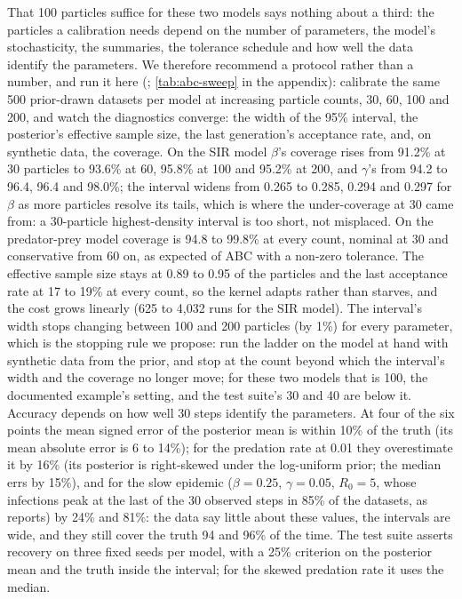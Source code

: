 That 100 particles suffice for these two models says nothing about a third: the particles a
calibration needs depend on the number of parameters, the model's stochasticity, the
summaries, the tolerance schedule and how well the data identify the parameters. We
therefore recommend a protocol rather than a number, and run it here
(; \cref{tab:abc-sweep} in the appendix): calibrate the
same 500 prior-drawn datasets per model at increasing particle counts, 30, 60, 100 and
200, and watch the diagnostics converge: the width of the 95\% interval, the posterior's
effective sample size, the last generation's acceptance rate, and, on synthetic data, the
coverage. On the SIR model $\beta$'s coverage rises from 91.2\% at 30 particles to 93.6\%
at 60, 95.8\% at 100 and 95.2\% at 200, and $\gamma$'s from 94.2 to 96.4, 96.4 and 98.0\%;
the interval widens from 0.265 to 0.285, 0.294 and 0.297 for $\beta$ as more particles
resolve its tails, which is where the under-coverage at 30 came from: a 30-particle
highest-density interval is too short, not misplaced. On the predator-prey model coverage
is 94.8 to 99.8\% at every count, nominal at 30 and conservative from 60 on, as expected of
ABC with a non-zero tolerance. The effective sample size stays at 0.89 to 0.95 of the particles
and the last acceptance rate at 17 to 19\% at every count, so the kernel adapts rather than
starves, and the cost grows linearly (625 to 4,032 runs for the SIR model). The interval's
width stops changing between 100 and 200 particles (by 1\%) for every parameter, which is
the stopping rule we propose: run the ladder on the model at hand with synthetic data from
the prior, and stop at the count beyond which the interval's width and the coverage no
longer move; for these two models that is 100, the documented example's setting, and the
test suite's 30 and 40 are below it. Accuracy depends
on how well 30 steps identify the parameters. At four of the six points the mean signed error of the posterior mean is within 10\% of the
truth (its mean absolute error is 6 to 14\%); for the predation rate at 0.01 they overestimate it by
16\% (its posterior is right-skewed under the log-uniform prior; the median errs by 15\%), and
for the slow epidemic ($\beta = 0.25$, $\gamma = 0.05$, $R_0 = 5$, whose infections peak at the last of the 30 observed steps in 85\% of the datasets, as
 reports) by 24\% and 81\%: the data say little about these values, the intervals
are wide, and they still cover the truth 94 and 96\% of the time.
The test suite asserts recovery on three fixed seeds per model, with a 25\% criterion on the
posterior mean and the truth inside the interval; for the skewed predation rate it uses the
median.

